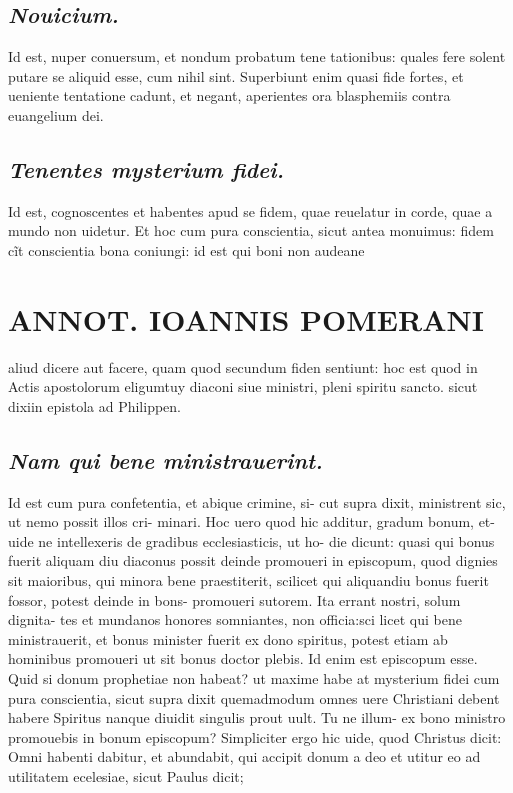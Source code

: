 \documentclass{article}
\begin{document}
\begin{pages}
\subsection*{\textit{Nouicium. }}\pstart Id est, nuper conuersum, et nondum probatum tene tationibus: quales fere solent putare se aliquid esse, cum nihil sint. Superbiunt enim quasi fide fortes, et ueniente tentatione cadunt, et negant, aperientes ora blasphemiis contra euangelium dei.  \pend
{}
{}
\subsection*{\textit{Tenentes mysterium fidei. }}\pstart Id est, cognoscentes et habentes apud se fidem, quae reuelatur in corde, quae a mundo non uidetur. Et hoc cum pura conscientia, sicut antea monuimus: fidem cĩt conscientia bona coniungi: id est qui boni non audeane  \pend
\section*{ANNOT. IOANNIS POMERANI }\pstart aliud dicere aut facere, quam quod secundum fiden sentiunt: hoc est quod in Actis apostolorum eligumtuy diaconi siue ministri, pleni spiritu sancto. sicut dixiin epistola ad Philippen.  \pend
{}
{}
\subsection*{\textit{Nam qui bene ministrauerint. }}\pstart Id est cum pura confetentia, et abique crimine, si- cut supra dixit, ministrent sic, ut nemo possit illos cri- minari. Hoc uero quod hic additur, gradum bonum, et- uide ne intellexeris de gradibus ecclesiasticis, ut ho- die dicunt: quasi qui bonus fuerit aliquam diu diaconus possit deinde promoueri in episcopum, quod dignies sit maioribus, qui minora bene praestiterit, scilicet qui aliquandiu bonus fuerit fossor, potest deinde in bons- promoueri sutorem. Ita errant nostri, solum dignita- tes et mundanos honores somniantes, non officia:sci licet qui bene ministrauerit, et bonus minister fuerit ex dono spiritus, potest etiam ab hominibus promoueri ut sit bonus doctor plebis. Id enim est episcopum esse. Quid si donum prophetiae non habeat? ut maxime habe at mysterium fidei cum pura conscientia, sicut supra dixit quemadmodum omnes uere Christiani debent habere Spiritus nanque diuidit singulis prout uult. Tu ne illum- ex bono ministro promouebis in bonum episcopum? Simpliciter ergo hic uide, quod Christus dicit: Omni habenti dabitur, et abundabit, qui accipit donum a deo et utitur eo ad utilitatem ecelesiae, sicut Paulus dicit;  \pend

\end{pages}
\end{document}
